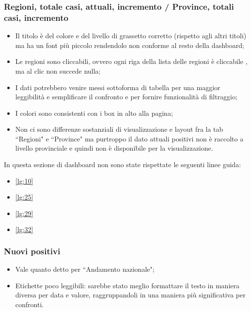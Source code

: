 \subsubsection{Regioni, totale casi, attuali, incremento / Province, totali casi, incremento}
\label{sss:regioni_province-totale_casi-attuali-incremento}
\begin{itemize}
    \item Il titolo è del colore e del livello di grassetto corretto (rispetto agli altri titoli) ma ha un font più piccolo rendendolo non conforme al resto della dashboard;
    \item Le regioni sono cliccabili, ovvero ogni riga della lista delle regioni è cliccabile , ma al clic non succede nulla;
    \item I dati potrebbero venire messi sottoforma di tabella  per una maggior leggibilità e semplificare il confronto e per fornire funzionalità di filtraggio;
    \item I colori sono consistenti con i box in alto alla pagina;
    \item Non ci sono differenze sostanziali di visualizzazione e layout fra la tab ``Regioni" e ``Province" ma purtroppo il dato attuali positivi non è raccolto a livello provinciale e quindi non è disponibile per la visualizzazione.
\end{itemize}
In questa sezione di dashboard non sono state rispettate le seguenti linee guida:
\begin{itemize}
    \item \ref{lg:10}
    \item \ref{lg:25}
    \item \ref{lg:29}
    \item \ref{lg:32}
\end{itemize}
\subsubsection{Nuovi positivi}
\label{sss:nuovi-positivi}
\begin{itemize}
        \item Vale quanto detto per ``Andamento nazionale";
        \item Etichette poco leggibili: sarebbe stato meglio formattare il testo in maniera diversa per data e valore, raggruppandoli in una maniera più significativa per confronti.
\end{itemize}

